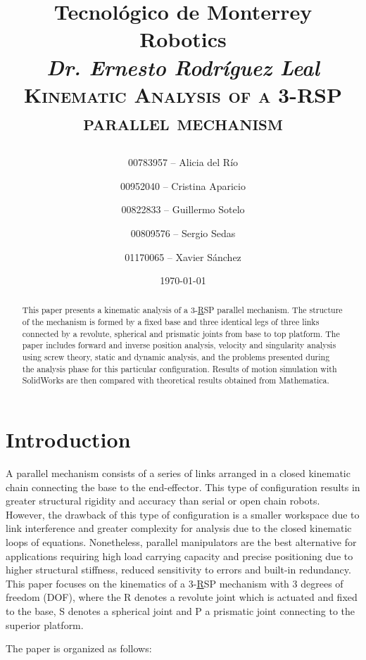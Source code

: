 \documentclass[titlepage, letterpaper, fleqn]{article}
\title{
\vspace{1in}
\textbf{Tecnológico de Monterrey} \\
\vspace{0.5in}
\textmd{Robotics} \\
\large{\textit{Dr. Ernesto Rodríguez Leal}} \\
\vspace{0.5in}
\textsc{Kinematic Analysis of a 3-RSP parallel mechanism}\\
\author{00783957 -- Alicia del Río \\
\and 00952040 -- Cristina Aparicio \\
\and 00822833 -- Guillermo Sotelo \\
\and 00809576 -- Sergio Sedas \\
\and 01170065 -- Xavier Sánchez}
\date{\today}
}
\begin{document}
\listoffixmes
\maketitle

\begin{abstract}
This paper presents a kinematic analysis of a 3-\underline{R}SP parallel mechanism.
The structure of the mechanism is formed by a fixed base and three identical legs of three links connected by a revolute, spherical and prismatic joints from base to top platform.
The paper includes forward and inverse position analysis, velocity and singularity analysis using screw theory, static and dynamic analysis, and the problems presented during the analysis phase for this particular configuration.
Results of motion simulation with SolidWorks are then compared with theoretical results obtained from Mathematica.
\end{abstract}


\section{Introduction}
\label{sec:intro}

A parallel mechanism consists of a series of links arranged in a closed kinematic chain connecting the base to the end-effector.
This type of configuration results in greater structural rigidity and accuracy than serial or open chain robots.
However, the drawback of this type of configuration is a smaller workspace due to link interference and greater complexity for analysis due to the closed kinematic loops of equations.
Nonetheless, parallel manipulators are the best alternative for applications requiring high load carrying capacity and precise positioning due to higher structural stiffness, reduced sensitivity to errors and built-in redundancy.
This paper focuses on the kinematics of a 3-\underline{R}SP mechanism with 3 degrees of freedom (DOF), where the R denotes a revolute joint which is actuated and fixed to the base, S denotes a spherical joint and P a prismatic joint connecting to the superior platform.

The paper is organized as follows:
\end{document}
